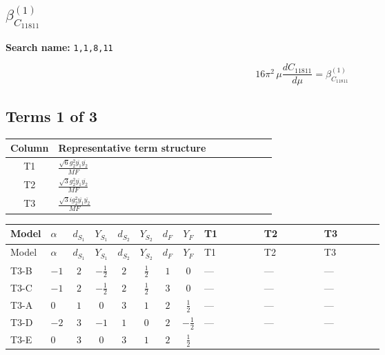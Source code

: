 \documentclass[8pt]{article}
\begin{document}
\begin{landscape}
\section*{$\beta_{C_{11811}}^{(1)}$}
\noindent\textbf{Search name: }\texttt{1,1,8,11}\par\smallskip
\[16\pi^2\,\mu\frac{d C_{11811}}{d\mu}=\beta_{C_{11811}}^{(1)}\]
\subsection*{Terms 1 of 3}
\begin{center}
\begin{tabular}{@{}c >{\raggedright\arraybackslash}p{0.82\linewidth}@{}}
\toprule
Column & Representative term structure \\
\midrule
T1 & \(\displaystyle \frac{\sqrt{6} g_{2}^{2} \overline{y_{1}} \overline{y_{2}}}{MF}\) \\
\midrule
T2 & \(\displaystyle \frac{\sqrt{3} g_{2}^{2} \overline{y_{1}} \overline{y_{2}}}{MF}\) \\
\midrule
T3 & \(\displaystyle \frac{\sqrt{3} i g_{2}^{2} \overline{y_{1}} \overline{y_{2}}}{MF}\) \\
\midrule
\bottomrule
\end{tabular}
\end{center}
\smallskip
\tiny
\begin{longtable}{@{}llcccccc >{\raggedright\arraybackslash}p{0.21\linewidth} >{\raggedright\arraybackslash}p{0.21\linewidth} >{\raggedright\arraybackslash}p{0.21\linewidth}@{}}
\toprule
Model & $\alpha$ & $d_{S_1}$ & $Y_{S_1}$ & $d_{S_2}$ & $Y_{S_2}$ & $d_F$ & $Y_F$ & T1 & T2 & T3 \\
\midrule
\endfirsthead
\toprule
Model & $\alpha$ & $d_{S_1}$ & $Y_{S_1}$ & $d_{S_2}$ & $Y_{S_2}$ & $d_F$ & $Y_F$ & T1 & T2 & T3 \\
\midrule
\endhead
T3-B & $-1$ & $2$ & $-\frac{1}{2}$ & $2$ & $\frac{1}{2}$ & $1$ & $0$ & --- & --- & --- \\
\midrule
T3-C & $-1$ & $2$ & $-\frac{1}{2}$ & $2$ & $\frac{1}{2}$ & $3$ & $0$ & --- & --- & --- \\
\midrule
T3-A & $0$ & $1$ & $0$ & $3$ & $1$ & $2$ & $\frac{1}{2}$ & --- & --- & --- \\
\midrule
T3-D & $-2$ & $3$ & $-1$ & $1$ & $0$ & $2$ & $-\frac{1}{2}$ & --- & --- & --- \\
\midrule
T3-E & $0$ & $3$ & $0$ & $3$ & $1$ & $2$ & $\frac{1}{2}$ & \scriptsize\adjustbox{max width=\linewidth}{$\begin{gathered} \frac{\sqrt{6} g_{2}^{2} \overline{y_{1}} \overline{y_{2}}}{3 MF}\end{gathered}$} & \scriptsize\adjustbox{max width=\linewidth}{$\begin{gathered} \frac{\sqrt{3} g_{2}^{2} \overline{y_{1}} \overline{y_{2}}}{6 MF}\end{gathered}$} & \scriptsize\adjustbox{max width=\linewidth}{$\begin{gathered} - \frac{49 \sqrt{3} i g_{2}^{2} \overline{y_{1}} \overline{y_{2}}}{24 MF}\end{gathered}$} \\

\end{longtable}
\end{landscape}
\end{document}
